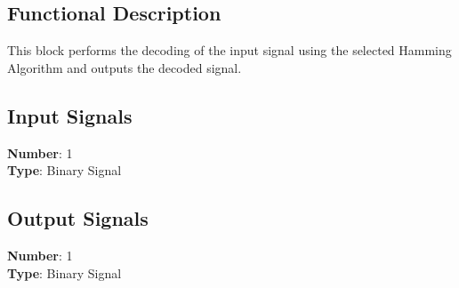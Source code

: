 \subsection*{Functional Description}

This block performs the decoding of the input signal using the selected Hamming Algorithm and outputs the decoded signal.

\subsection*{Input Signals}

\textbf{Number}: 1\\
\textbf{Type}: Binary Signal

\subsection*{Output Signals}

\textbf{Number}: 1\\
\textbf{Type}: Binary Signal

%
